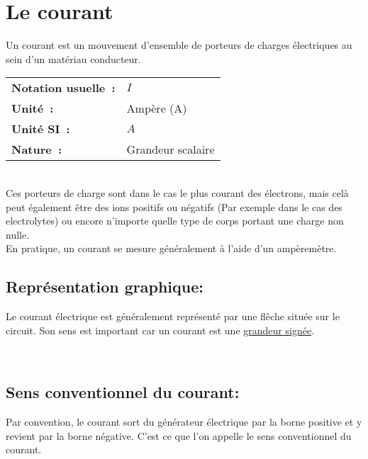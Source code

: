 \section{Le courant}

Un courant est un mouvement d'ensemble de porteurs de charges électriques au sein d'un matériau conducteur. \\

\begin{tabular}{ll}
\textbf{Notation usuelle~:} & $I$ \\
	\textbf{Unité~:} & Ampère (A) \\
\textbf{Unité SI~:} & $A$ \\
\textbf{Nature~:} & Grandeur scalaire \\
\end{tabular} \\

Ces porteurs de charge sont dans le cas le plus courant des électrons, mais celà peut également être des ions positifs ou négatifs (Par exemple dans le cas des electrolytes) ou encore n'importe quelle type de corps portant une charge non nulle. \\

En pratique, un courant se mesure généralement à l'aide d'un ampèremètre. 
\subsection*{ Représentation graphique: }

\begin{minipage}{7cm}
	 
\end{minipage}
\hspace{1cm}
\begin{minipage}{7cm}
	Le courant électrique est généralement représenté par une flêche située sur le circuit. Son sens est important car un courant est une \underline{grandeur signée}. 
\end{minipage}\\


\subsection*{ Sens conventionnel du courant: }

Par convention, le courant sort du générateur électrique par la borne positive et y revient par la borne négative. C'est ce que l'on appelle le sens conventionnel du courant. \\

